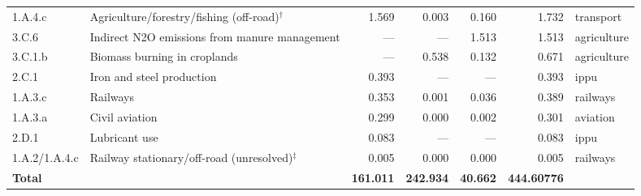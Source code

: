 \begin{tabular}{@{}llrrrrl@{}}
1.A.4.c & Agriculture/forestry/fishing (off-road)$^{\dagger}$ & 1.569 & 0.003 & 0.160 & 1.732 & transport \\
3.C.6 & Indirect N2O emissions from manure management & --- & --- & 1.513 & 1.513 & agriculture \\
3.C.1.b & Biomass burning in croplands & --- & 0.538 & 0.132 & 0.671 & agriculture \\
2.C.1 & Iron and steel production & 0.393 & --- & --- & 0.393 & ippu \\
1.A.3.c & Railways & 0.353 & 0.001 & 0.036 & 0.389 & railways \\
1.A.3.a & Civil aviation & 0.299 & 0.000 & 0.002 & 0.301 & aviation \\
2.D.1 & Lubricant use & 0.083 & --- & --- & 0.083 & ippu \\
1.A.2/1.A.4.c & Railway stationary/off-road (unresolved)$^{\ddagger}$ & 0.005 & 0.000 & 0.000 & 0.005 & railways \\
\midrule
\textbf{Total} & & \textbf{161.011} & \textbf{242.934} & \textbf{40.662} & \textbf{444.60776} & \\
\bottomrule
\end{tabular}
